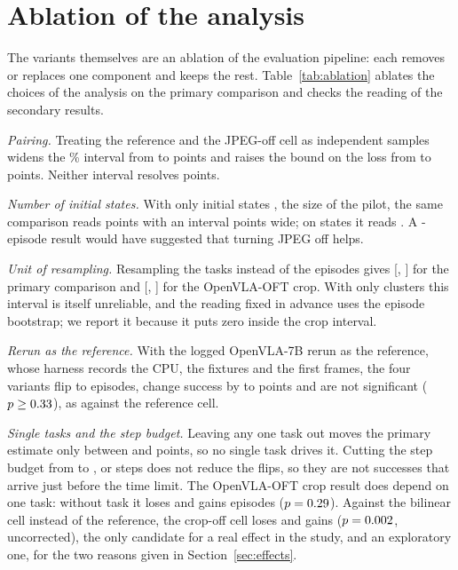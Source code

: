 \section{Ablation of the analysis}
\label{app:ablation}

The variants themselves are an ablation of the evaluation pipeline: each removes or replaces one component and keeps the rest. Table~\ref{tab:ablation} ablates the choices of the analysis on the primary comparison and checks the reading of the secondary results.



\emph{Pairing.} Treating the reference and the JPEG-off cell as independent samples widens the \AlphaPct\% interval from \AblPairedW{} to \AblUnpairedW{} points and raises the bound on the loss from \AblPairedUB{} to \AblUnpairedUB{} points. Neither interval resolves \ThresholdPts{} points.

\emph{Number of initial states.} With only initial states \SplitA, the size of the pilot, the same comparison reads \AblFirstDiff{} points with an interval \AblFirstW{} points wide; on states \SplitB{} it reads \OutDiff. A \PilotPairs-episode result would have suggested that turning JPEG off helps.

\emph{Unit of resampling.} Resampling the \NTasks{} tasks instead of the episodes gives [\ClusJpegLo, \ClusJpegHi] for the primary comparison and [\ClusOftCropLo, \ClusOftCropHi] for the OpenVLA-OFT crop. With only \NTasks{} clusters this interval is itself unreliable, and the reading fixed in advance uses the episode bootstrap; we report it because it puts zero inside the crop interval.

\emph{Rerun as the reference.} With the logged OpenVLA-7B rerun as the reference, whose harness records the CPU, the fixtures and the first frames, the four variants flip \VrFlipsMin{} to \VrFlipsMax{} episodes, change success by \VrDiffMin{} to \VrDiffMax{} points and are not significant ($p \geq 0.33$), as against the reference cell.

\emph{Single tasks and the step budget.} Leaving any one task out moves the primary estimate only between \AblLooMin{} and \AblLooMax{} points, so no single task drives it. Cutting the step budget from \MaxSteps{} to \BudgetA, \BudgetB{} or \BudgetC{} steps does not reduce the flips, so they are not successes that arrive just before the time limit. The OpenVLA-OFT crop result does depend on one task: without task \TaskFive{} it loses \OftCropNoFiveLost{} and gains \OftCropNoFiveGained{} episodes ($p = 0.29$). Against the bilinear cell instead of the reference, the crop-off cell loses \OftCropVsBilLost{} and gains \OftCropVsBilGained{} ($p = 0.002$, uncorrected), the only candidate for a real effect in the study, and an exploratory one, for the two reasons given in Section~\ref{sec:effects}.

